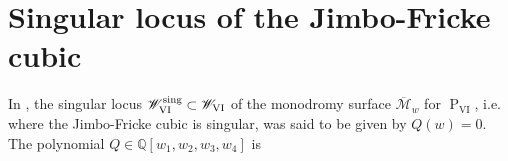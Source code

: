 \documentclass[a4paper,reqno]{amsart}
\numberwithin{equation}{section}
\newcommand{\pain}[1]{\operatorname{P}_{\mathrm{#1}}}
\numberwithin{equation}{section}
\begin{document}
\appendix 


\section{Singular locus of the Jimbo-Fricke cubic}
\label{app:singularlocusofJimboFricke}
\begingroup\allowdisplaybreaks
In , the singular locus $\mathscr{W}_{\rm{VI}}^{\operatorname{sing}}\subset \mathscr{W}_{\rm{VI}}$ of the monodromy surface $\overline{\mathcal{M}}_w$ for $\pain{VI}$, i.e. where the Jimbo-Fricke cubic is singular, was said to be given by $Q(w)=0$.
The polynomial $Q\in \mathbb{Q}[w_1,w_2,w_3,w_4]$ is
\end{document}
